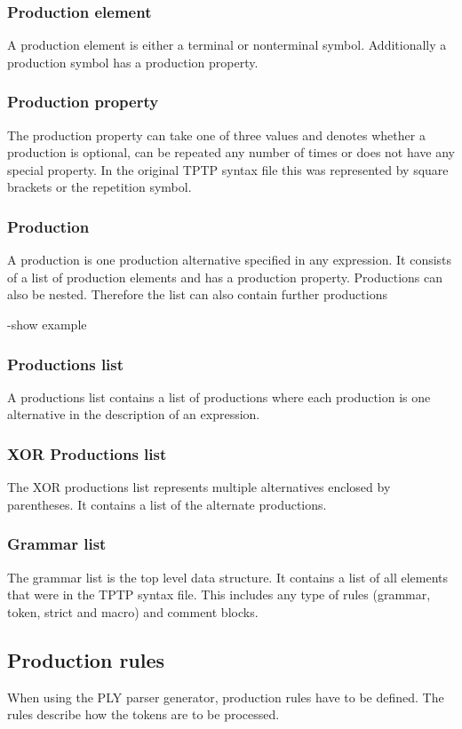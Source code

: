 \subsubsection{Production element}
A production element is either a terminal or nonterminal symbol. Additionally a production symbol has a production property.

\subsubsection{Production property}
The production property can take one of three values and denotes whether a production is optional, can be repeated any number of times or does not have any special property.
In the original \ac{TPTP} syntax file this was represented by square brackets or the repetition symbol.

\subsubsection{Production}
A production is one production alternative specified in any expression.
It consists of a list of production elements and has a production property. Productions can also be nested.
Therefore the list can also contain further productions

-show example

\subsubsection{Productions list}
A productions list contains a list of productions where each production is one alternative in the description of an expression.

\subsubsection{XOR Productions list}
The XOR productions list represents multiple alternatives enclosed by parentheses. It contains a list of the alternate productions.
 
\subsubsection{Grammar list}
The grammar list is the top level data structure. It contains a list of all elements that were in the \ac{TPTP} syntax file.
This includes any type of rules (grammar, token, strict and macro) and comment blocks.

\subsection{Production rules}
When using the \ac{PLY} parser generator, production rules have to be defined.
The rules describe how the tokens are to be processed.

